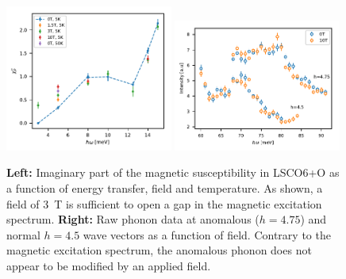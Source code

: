 \begin{figure}
    \centering
    \includegraphics[width=0.49\textwidth]{fig/anomaly/chi.pdf}
    \includegraphics[width=0.49\textwidth]{fig/anomaly/field_selected.pdf}
    \caption[LSCO6+O magnetic field effect on fluctuations and phonon]{\textbf{Left:} Imaginary part of the magnetic susceptibility in LSCO6+O as a function of energy transfer, field and temperature. As shown, a field of \SI{3}{\tesla} is sufficient to open a gap in the magnetic excitation spectrum. \textbf{Right:} Raw phonon data at anomalous ($h=4.75$) and normal $h=4.5$ wave vectors as a function of field. Contrary to the magnetic excitation spectrum, the anomalous phonon does not appear to be modified by an applied field.}
    \label{fig:phonon_chi_field}
\end{figure}
